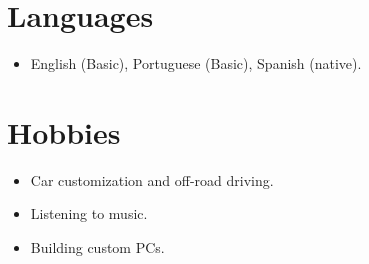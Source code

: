 \documentclass{article}
\begin{document}
\section*{Languages}

\begin{itemize}
  \item English (Basic), Portuguese (Basic), Spanish (native).
\end{itemize}

\section*{Hobbies}

\begin{itemize}
  \item Car customization and off-road driving.
  \item Listening to music.
  \item Building custom PCs.
\end{itemize}
\end{document}

